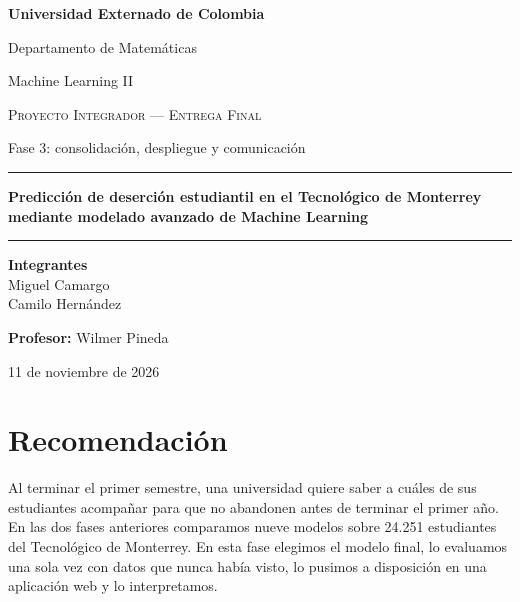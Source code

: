 \documentclass[11pt,a4paper]{article}
\newcommand{\tituloProyecto}{Predicción de deserción estudiantil en el Tecnológico de Monterrey mediante modelado avanzado de Machine Learning}
\newcommand{\nombreCurso}{Machine Learning II}
\newcommand{\nombreProfesor}{Wilmer Pineda}
\begin{document}
\begin{titlepage}
\centering
\vspace*{1.5cm}
{\Large\bfseries Universidad Externado de Colombia\par}
\vspace{0.2cm}
{\large Departamento de Matemáticas\par}
\vspace{0.15cm}
{\large \nombreCurso\par}
\vspace{2.2cm}

{\large\scshape Proyecto Integrador --- Entrega Final\par}
\vspace{0.2cm}
{\normalsize Fase 3: consolidación, despliegue y comunicación\par}
\vspace{0.4cm}
\rule{0.6\linewidth}{0.4pt}
\vspace{0.6cm}

{\Huge\bfseries \tituloProyecto \par}
\vspace{0.6cm}
\rule{0.6\linewidth}{0.4pt}

\vfill

\begin{minipage}{0.75\linewidth}
\centering
\textbf{Integrantes}\\[0.3cm]
Miguel Camargo \\
Camilo Hernández
\end{minipage}

\vspace{1.2cm}
\textbf{Profesor:} \nombreProfesor

\vspace{1.2cm}
{\large 11 de noviembre de 2026 \par}
\vfill
\end{titlepage}

\setcounter{page}{1}

\section{Recomendación}

Al terminar el primer semestre, una universidad quiere saber a cuáles de sus estudiantes acompañar para que no abandonen antes de terminar el primer año. En las dos fases anteriores comparamos nueve modelos sobre 24.251 estudiantes del Tecnológico de Monterrey. En esta fase elegimos el modelo final, lo evaluamos una sola vez con datos que nunca había visto, lo pusimos a disposición en una aplicación web y lo interpretamos.
\end{document}

